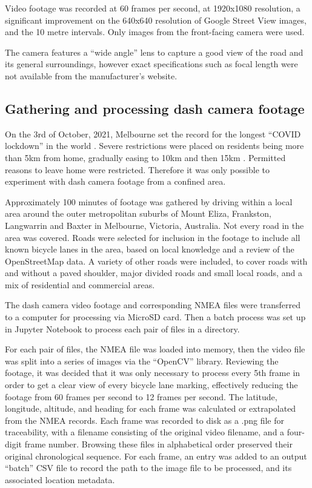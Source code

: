 \documentclass[11pt,twoside]{report}
\begin{document}
Video footage was recorded at 60 frames per second, at 1920x1080 resolution, a significant improvement on the 640x640 resolution of Google Street View images, and the 10 metre intervals.  Only images from the front-facing camera were used.

The camera features a ``wide angle'' lens to capture a good view of the road and its general surroundings, however exact specifications such as focal length were not available from the manufacturer's website.


\subsection{Gathering and processing dash camera footage}
\label{s:rq3b}

On the 3rd of October, 2021, Melbourne set the record for the longest ``COVID lockdown'' in the world \cite{lockdown_record}.  Severe restrictions were placed on residents being more than 5km from home, gradually easing to 10km and then 15km \cite{lockdown_5km}.  Permitted reasons to leave home were restricted.  Therefore it was only possible to experiment with dash camera footage from a confined area.

Approximately 100 minutes of footage was gathered by driving within a local area around the outer metropolitan suburbs of Mount Eliza, Frankston, Langwarrin and Baxter in Melbourne, Victoria, Australia.  Not every road in the area was covered.  Roads were selected for inclusion in the footage to include all known bicycle lanes in the area, based on local knowledge and a review of the OpenStreetMap data.  A variety of other roads were included, to cover roads with and without a paved shoulder, major divided roads and small local roads, and a mix of residential and commercial areas.

The dash camera video footage and corresponding NMEA files were transferred to a computer for processing via MicroSD card.  Then a batch process was set up in Jupyter Notebook to process each pair of files in a directory.

For each pair of files, the NMEA file was loaded into memory, then the video file was split into a series of images via the ``OpenCV'' library.  Reviewing the footage, it was decided that it was only necessary to process every 5th frame in order to get a clear view of every bicycle lane marking, effectively reducing the footage from 60 frames per second to 12 frames per second.  The latitude, longitude, altitude, and heading for each frame was calculated or extrapolated from the NMEA records.  Each frame was recorded to disk as a .png file for traceability, with a filename consisting of the original video filename, and a four-digit frame number.  Browsing these files in alphabetical order preserved their original chronological sequence.  For each frame, an entry was added to an output ``batch'' CSV file to record the path to the image file to be processed, and its associated location metadata.
\end{document}
